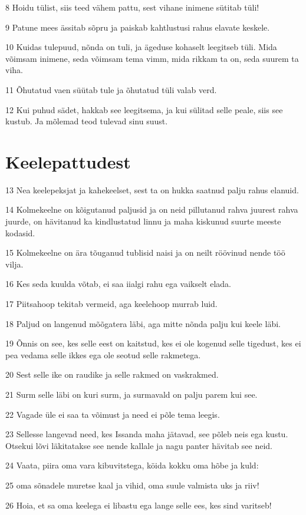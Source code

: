 \par 8 Hoidu tülist, siis teed vähem pattu, sest vihane inimene sütitab tüli!
\par 9 Patune mees ässitab sõpru ja paiskab kahtlustusi rahus elavate keskele.
\par 10 Kuidas tulepuud, nõnda on tuli, ja ägeduse kohaselt leegitseb tüli. Mida võimsam inimene, seda võimsam tema vimm, mida rikkam ta on, seda suurem ta viha.
\par 11 Õhutatud vaen süütab tule ja õhutatud tüli valab verd.
\par 12 Kui puhud sädet, hakkab see leegitsema, ja kui sülitad selle peale, siis see kustub. Ja mõlemad teod tulevad sinu suust.

\section*{Keelepattudest}

\par 13 Nea keelepeksjat ja kahekeelset, sest ta on hukka saatnud palju rahus elanuid.
\par 14 Kolmekeelne on kõigutanud paljusid ja on neid pillutanud rahva juurest rahva juurde, on hävitanud ka kindlustatud linnu ja maha kiskunud suurte meeste kodasid.
\par 15 Kolmekeelne on ära tõuganud tublisid naisi ja on neilt röövinud nende töö vilja.
\par 16 Kes seda kuulda võtab, ei saa iialgi rahu ega vaikselt elada.
\par 17 Piitsahoop tekitab vermeid, aga keelehoop murrab luid.
\par 18 Paljud on langenud mõõgatera läbi, aga mitte nõnda palju kui keele läbi.
\par 19 Õnnis on see, kes selle eest on kaitstud, kes ei ole kogenud selle tigedust, kes ei pea vedama selle ikkes ega ole seotud selle rakmetega.
\par 20 Sest selle ike on raudike ja selle rakmed on vaskrakmed.
\par 21 Surm selle läbi on kuri surm, ja surmavald on palju parem kui see.
\par 22 Vagade üle ei saa ta võimust ja need ei põle tema leegis.
\par 23 Sellesse langevad need, kes Issanda maha jätavad, see põleb neis ega kustu. Otsekui lõvi läkitatakse see nende kallale ja nagu panter hävitab see neid.
\par 24 Vaata, piira oma vara kibuvitstega, köida kokku oma hõbe ja kuld:
\par 25 oma sõnadele muretse kaal ja vihid, oma suule valmista uks ja riiv!
\par 26 Hoia, et sa oma keelega ei libastu ega lange selle ees, kes sind varitseb!

